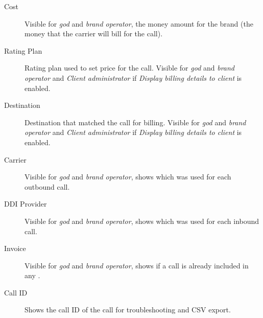 \documentclass[letterpaper,10pt,english]{sphinxmanual}
\begin{document}
\begin{description}
\item[{Cost}] \leavevmode{}\label{administration_portal/client/residential/calls/external_calls:term-cost}
Visible for \emph{god} and \emph{brand operator}, the money amount for the brand (the money that the carrier will bill for the call).

\item[{Rating Plan}] \leavevmode{}\label{administration_portal/client/residential/calls/external_calls:term-rating-plan}
Rating plan used to set price for the call. Visible for \emph{god} and \emph{brand operator} and \emph{Client administrator} if
\emph{Display billing details to client} is enabled.

\item[{Destination}] \leavevmode{}\label{administration_portal/client/residential/calls/external_calls:term-destination}
Destination that matched the call for billing. Visible for \emph{god} and \emph{brand operator} and \emph{Client administrator} if
\emph{Display billing details to client} is enabled.

\item[{Carrier}] \leavevmode{}\label{administration_portal/client/residential/calls/external_calls:term-carrier}
Visible for \emph{god} and \emph{brand operator}, shows which {\hyperref[administration_portal/brand/providers/carriers:carriers]{}} was used for each outbound call.

\item[{DDI Provider}] \leavevmode{}\label{administration_portal/client/residential/calls/external_calls:term-ddi-provider}
Visible for \emph{god} and \emph{brand operator}, shows which {\hyperref[administration_portal/brand/providers/ddi_providers:ddi\string-providers]{}} was used for each inbound call.

\item[{Invoice}] \leavevmode{}\label{administration_portal/client/residential/calls/external_calls:term-invoice}
Visible for \emph{god} and \emph{brand operator}, shows if a call is already included in any {\hyperref[administration_portal/brand/invoicing/invoices:invoices]{}}.

\item[{Call ID}] \leavevmode{}\label{administration_portal/client/residential/calls/external_calls:term-call-id}
Shows the call ID of the call for troubleshooting and CSV export.


\end{description}
\end{document}
